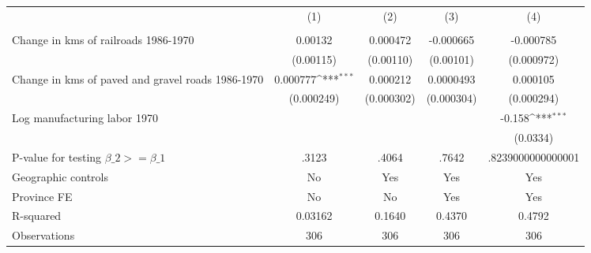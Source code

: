 {
\def\sym#1{\ifmmode^{#1}\else\(^{#1}\)\fi}
\begin{tabular}{l*{4}{c}}
\hline\hline
                &\multicolumn{1}{c}{(1)}&\multicolumn{1}{c}{(2)}&\multicolumn{1}{c}{(3)}&\multicolumn{1}{c}{(4)}\\
                &\multicolumn{1}{c}{}&\multicolumn{1}{c}{}&\multicolumn{1}{c}{}&\multicolumn{1}{c}{}\\
\hline
Change in kms of railroads 1986-1970&  0.00132         & 0.000472         &-0.000665         &-0.000785         \\
                &(0.00115)         &(0.00110)         &(0.00101)         &(0.000972)         \\
[1em]
Change in kms of paved and gravel roads 1986-1970& 0.000777\sym{***}& 0.000212         &0.0000493         & 0.000105         \\
                &(0.000249)         &(0.000302)         &(0.000304)         &(0.000294)         \\
[1em]
Log manufacturing labor 1970&                  &                  &                  &   -0.158\sym{***}\\
                &                  &                  &                  & (0.0334)         \\
\hline
P-value for testing $\beta\_{2} >= \beta\_{1}$&    .3123         &    .4064         &    .7642         &.8239000000000001         \\
Geographic controls&       No         &      Yes         &      Yes         &      Yes         \\
Province FE     &       No         &       No         &      Yes         &      Yes         \\
R-squared       &  0.03162         &   0.1640         &   0.4370         &   0.4792         \\
Observations    &      306         &      306         &      306         &      306         \\
\hline\hline
\end{tabular}
}
